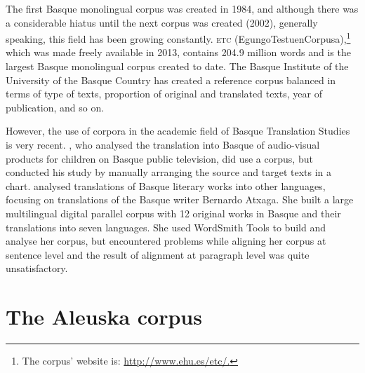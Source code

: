 \documentclass[output=paper]{LSP/langsci}
\begin{document}
The first Basque monolingual corpus was created in 1984, and although there was a considerable hiatus until the next corpus was created (2002), generally speaking, this field has been growing constantly. \textsc{etc} (EgungoTestuenCorpusa),\footnote{The corpus' website is: \url{http://www.ehu.es/etc/.}} which was made freely available in 2013, contains 204.9 million words and is the largest Basque monolingual corpus created to date. The Basque Institute of the University of the Basque Country has created a reference corpus balanced in terms of type of texts, proportion of original and translated texts, year of publication, and so on. \enlargethispage{1\baselineskip}

However, the use of corpora in the academic field of Basque Translation Studies is very recent. \citet{Barambones2012}, who analysed the translation into Basque of audio-visual products for children on Basque public television, did use a corpus, but conducted his study by manually arranging the source and target texts in a chart. \citet{Manterola2011} analysed translations of Basque literary works into other languages, focusing on translations of the Basque writer Bernardo Atxaga. She built a large multilingual digital parallel corpus with 12 original works in Basque and their translations into seven languages. She used WordSmith Tools \citep{Scott2004} to build and analyse her corpus, but encountered problems while aligning her corpus at sentence level and the result of alignment at paragraph level was quite unsatisfactory.

\section{The Aleuska corpus} \label{sec:3:2}
\end{document}
